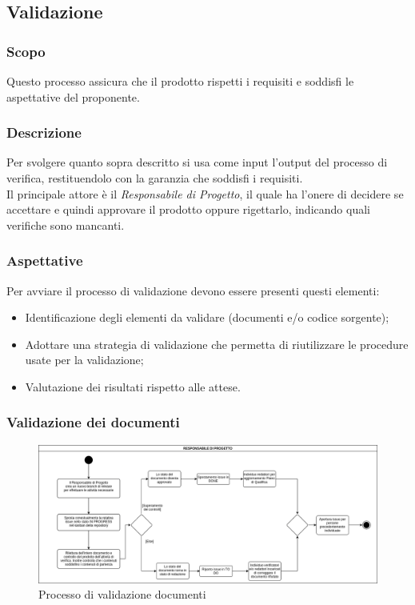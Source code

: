 \subsection{Validazione}
\subsubsection{Scopo}
Questo processo assicura che il prodotto rispetti i requisiti e soddisfi le aspettative del proponente.

\subsubsection{Descrizione}
Per svolgere quanto sopra descritto si  usa come input l'output del processo di verifica,
restituendolo con la garanzia che soddisfi i requisiti.\\
Il principale attore è il \textit{Responsabile di Progetto}, il quale ha l'onere di decidere
se accettare e quindi approvare il prodotto oppure rigettarlo, indicando quali verifiche sono mancanti.

\subsubsection{Aspettative}
Per avviare il processo di validazione devono essere presenti questi elementi:
\begin{itemize}
    \item Identificazione degli elementi da validare (documenti e/o codice sorgente);
    \item Adottare una strategia di validazione che permetta di riutilizzare le procedure usate
    per la validazione;
    \item Valutazione dei risultati rispetto alle attese.
\end{itemize}

\subsubsection{Validazione dei documenti}
\begin{figure}[h!]
    \includegraphics[width=\linewidth]{res/images/processo_validazione.png}
    \caption{Processo di validazione documenti}
\end{figure}

